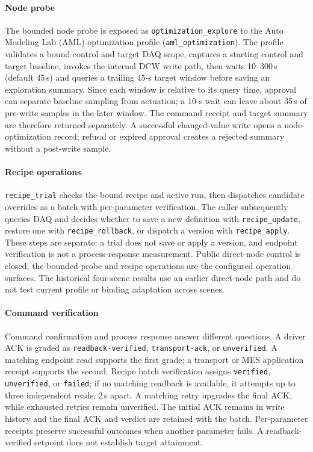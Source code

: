 \paragraph{Node probe}
The bounded node probe is exposed as \texttt{optimization\_explore} to the
Auto Modeling Lab (AML) optimization profile (\texttt{aml\_optimization}).
The profile validates a bound control and target DAQ scope,
captures a starting control and target baseline, invokes the internal DCW
write path, then waits 10--300\,s (default 45\,s) and queries a trailing 45-s
target window before saving an exploration summary. Since each window is
relative to its query time, approval can separate baseline sampling from
actuation; a 10-s wait can leave about 35\,s of pre-write samples in the later
window. The command receipt and target summary are therefore returned
separately. A successful changed-value write opens a node-optimization
record; refusal or expired approval creates a rejected summary without a
post-write sample.

\paragraph{Recipe operations}
\texttt{recipe\_trial} checks the bound recipe and active run, then dispatches
candidate overrides as a batch with per-parameter verification. The caller
subsequently queries DAQ and decides whether to save a new definition with
\texttt{recipe\_update}, restore one with \texttt{recipe\_rollback}, or
dispatch a version with \texttt{recipe\_apply}. These steps are separate: a
trial does not save or apply a version, and endpoint verification is not a
process-response measurement. Public direct-node control is closed; the
bounded probe and recipe operations are the configured operation surfaces.
The historical four-scene results use an earlier direct-node path and do not
test current profile or binding adaptation across scenes.

\paragraph{Command verification}
Command confirmation and process response answer different questions. A
driver ACK is graded as \texttt{readback-verified}, \texttt{transport-ack},
or \texttt{unverified}. A matching endpoint read supports the first grade; a
transport or MES application receipt supports the second. Recipe batch
verification assigns \texttt{verified}, \texttt{unverified}, or
\texttt{failed}; if no matching readback is available, it attempts up to
three independent reads, 2\,s apart. A matching retry upgrades the final ACK,
while exhausted retries remain unverified. The initial ACK remains in write
history and the final ACK and verdict are retained with the batch.
Per-parameter receipts preserve successful outcomes when another parameter
fails. A readback-verified setpoint does not establish target attainment.

